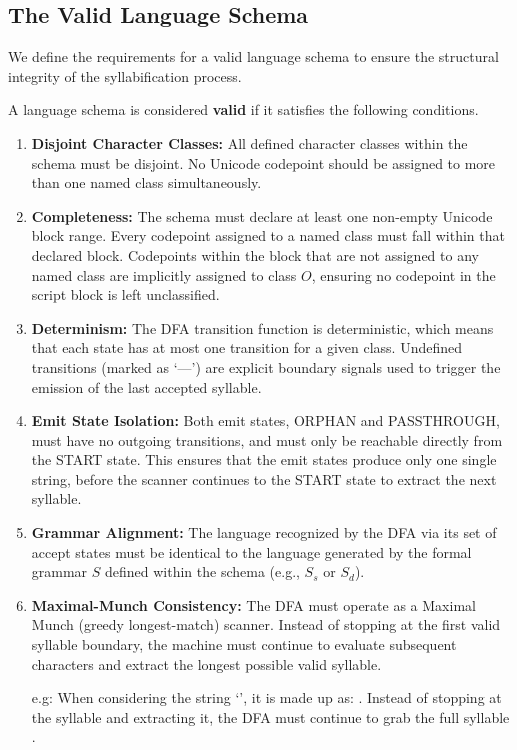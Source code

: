 \subsection{The Valid Language Schema}
We define the requirements for a valid language schema to ensure the structural integrity of the syllabification process.
\begin{definition}
\label{def:valid_schema}
A language schema is considered \textbf{valid} if it satisfies the following conditions.
    \begin{enumerate}
        \item \textbf{Disjoint Character Classes:} All defined character classes within the schema must be disjoint. No Unicode codepoint should be assigned to more than one named class simultaneously.
        \item \textbf{Completeness:} The schema must declare at least one non-empty Unicode block range. Every codepoint assigned to a named class must fall within that declared block. Codepoints within the block that are not assigned to any named class are implicitly assigned to class $O$, ensuring no codepoint in the script block is left unclassified.
        \item \textbf{Determinism:} The DFA transition function is deterministic, which means that each state has at most one transition for a given class. Undefined transitions (marked as `---') are explicit boundary signals used to trigger the emission of the last accepted syllable.
        \item \textbf{Emit State Isolation:} Both emit states, ORPHAN and PASSTHROUGH, must have no outgoing transitions, and must only be reachable directly from the START state. This ensures that the emit states produce only one single string, before the scanner continues to the START state to extract the next syllable.
        \item \textbf{Grammar Alignment:} The language recognized by the DFA via its set of accept states must be identical to the language generated by the formal grammar $S$ defined within the schema (e.g., $S_s$ or $S_d$).
        \item \textbf{Maximal-Munch Consistency:} The DFA must operate as a Maximal Munch (greedy longest-match) scanner. Instead of stopping at the first valid syllable boundary, the machine must continue to evaluate subsequent characters and extract the longest possible valid syllable.

        e.g: When considering the string `', it is made up as: . Instead of stopping at the syllable  and extracting it, the DFA must continue to grab the full syllable .
    \end{enumerate}
\end{definition}

